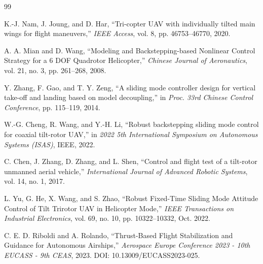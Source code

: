 \documentclass[a4paper,12pt]{article}
\begin{document}
\begin{thebibliography}{99}

K.-J. Nam, J. Joung, and D. Har, ``Tri-copter UAV with individually tilted main wings for flight maneuvers,'' \textit{IEEE Access}, vol. 8, pp. 46753–46770, 2020.

A. A. Mian and D. Wang, ``Modeling and Backstepping-based Nonlinear Control Strategy for a 6 DOF Quadrotor Helicopter,'' \textit{Chinese Journal of Aeronautics}, vol. 21, no. 3, pp. 261–268, 2008.

Y. Zhang, F. Gao, and T. Y. Zeng, ``A sliding mode controller design for vertical take-off and landing based on model decoupling,'' in \textit{Proc. 33rd Chinese Control Conference}, pp. 115–119, 2014.

W.-G. Cheng, R. Wang, and Y.-H. Li, ``Robust backstepping sliding mode control for coaxial tilt-rotor UAV,'' in \textit{2022 5th International Symposium on Autonomous Systems (ISAS)}, IEEE, 2022.

C. Chen, J. Zhang, D. Zhang, and L. Shen, ``Control and flight test of a tilt-rotor unmanned aerial vehicle,'' \textit{International Journal of Advanced Robotic Systems}, vol. 14, no. 1, 2017.

L. Yu, G. He, X. Wang, and S. Zhao, ``Robust Fixed-Time Sliding Mode Attitude Control of Tilt Trirotor UAV in Helicopter Mode,'' \textit{IEEE Transactions on Industrial Electronics}, vol. 69, no. 10, pp. 10322–10332, Oct. 2022.

C. E. D. Riboldi and A. Rolando, ``Thrust-Based Flight Stabilization and Guidance for Autonomous Airships,'' \textit{Aerospace Europe Conference 2023 - 10th EUCASS - 9th CEAS}, 2023. DOI: 10.13009/EUCASS2023-025.

\end{thebibliography}
\end{document}
